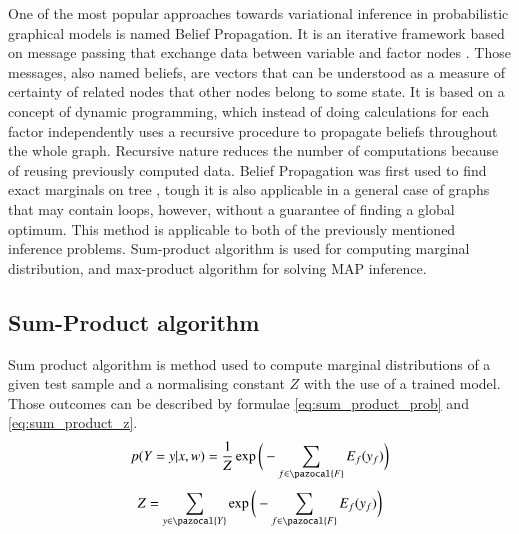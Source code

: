 One of the most popular approaches towards variational inference in probabilistic graphical models is named Belief Propagation. It is an iterative framework based on message passing that exchange data between variable and factor nodes \cite{markov_blake}. Those messages, also named beliefs, are vectors that can be understood as a measure of certainty of related nodes that other nodes belong to some state. It is based on a concept of dynamic programming, which instead of doing calculations for each factor independently uses a recursive procedure to propagate beliefs throughout the whole graph. Recursive nature reduces the number of computations because of reusing previously computed data. Belief Propagation was first used to find exact marginals on tree \cite{bayes_pearl}, tough it is also applicable in a general case of graphs that may contain loops, however, without a guarantee of finding a  global optimum. This method is applicable to both of the previously mentioned inference problems. Sum-product algorithm is used for computing marginal distribution, and max-product algorithm for solving MAP inference. 

\subsection{Sum-Product algorithm}
Sum product algorithm is method used to compute marginal distributions of a given test sample and a normalising constant $Z$ with the use of a trained model. Those outcomes can be described by formulae \ref{eq:sum_product_prob} and \ref{eq:sum_product_z}.
\begin{equation}
    \label{eq:sum_product_prob}
    p(Y=y|x,w)=\frac{1}{Z}\exp{\bigg(-\sum_{f \in \pazocal{F}}{E_f(y_f)}\bigg)} 
\end{equation}
\begin{equation}
    \label{eq:sum_product_z}
     Z=\sum_{y \in \pazocal{Y}}{\exp{\bigg(-\sum_{f \in \pazocal{F}}{E_f(y_f)}\bigg)}} 
\end{equation}

